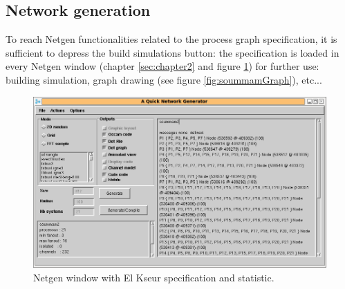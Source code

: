 \subsection{Network generation}

To reach Netgen functionalities related to the process graph specification, 
it is sufficient to depress the build simulations button: the specification is 
loaded in every Netgen window (chapter \ref{sec:chapter2} and figure \ref{fig:soummamNetgen})  
for further use: building simulation, graph drawing (see figure \ref{fig:soummamGraph}), etc... 


\begin{figure}
\begin{center}
\includegraphics[width=12cm]{netgenSoummam.png}
\caption{Netgen window with El Kseur specification and statistic. }
\label{fig:soummamNetgen}
\end{center}
\end{figure}


